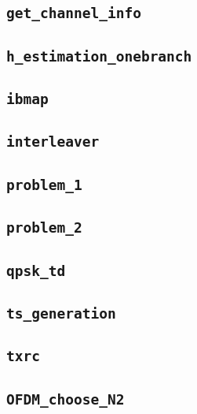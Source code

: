 \documentclass[10pt]{article}
\numberwithin{equation}{section}
\begin{document}
\subsection*{\texttt{get\_channel\_info}}


\subsection*{\texttt{h\_estimation\_onebranch}}


\subsection*{\texttt{ibmap}}


\subsection*{\texttt{interleaver}}


\subsection*{\texttt{problem\_1}}


\subsection*{\texttt{problem\_2}}


\subsection*{\texttt{qpsk\_td}}


\subsection*{\texttt{ts\_generation}}


\subsection*{\texttt{txrc}}


\subsection*{\texttt{OFDM\_choose\_N2}}

\end{document}
